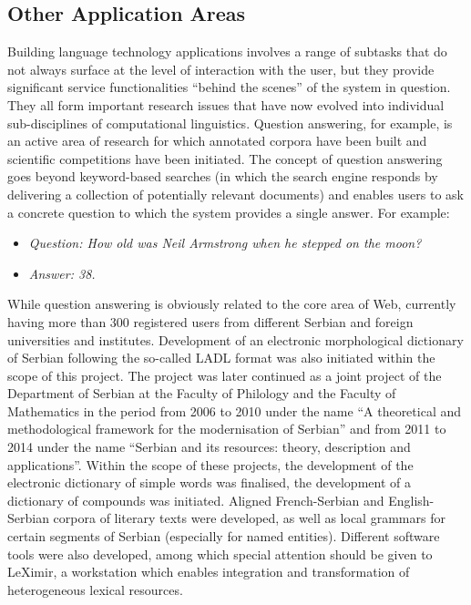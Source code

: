 \begin{multicols}{2}
 \subsection {Other Application Areas}

Building language technology applications involves a range of subtasks that do not always surface at the level of interaction with the user, but they provide significant service functionalities “behind the scenes” of the system in question. They all form important research issues that have now evolved into individual sub-disciplines of computational linguistics. Question answering, for example, is an active area of research for which annotated corpora have been built and scientific competitions have been initiated. The concept of question answering goes beyond keyword-based searches (in which the search engine responds by delivering a collection of potentially relevant documents) and enables users to ask a concrete question to which the system provides a single answer. For example:

\begin{itemize}
\item[] \textit{Question: How old was Neil Armstrong when he stepped on the moon?}
\item[] \textit{Answer: 38.}
\end{itemize}

While question answering is obviously related to the core area of Web, currently having more than 300 registered users from different Serbian and foreign universities and institutes. Development of an electronic morphological dictionary of Serbian following the so-called LADL format was also initiated within the scope of this project. \cite{KRSTEV} The project was later continued as a joint project of the Department of Serbian at the Faculty of Philology and the Faculty of Mathematics in the period from 2006 to 2010 under the name “A theoretical and methodological framework for the modernisation of Serbian” and from 2011 to 2014 under the name “Serbian and its resources: theory, description and applications”. Within the scope of these projects, the development of the electronic dictionary of simple words was finalised, the development of a dictionary of compounds was initiated. Aligned French-Serbian and English-Serbian corpora of literary texts were developed, as well as local grammars for certain segments of Serbian (especially for named entities). Different software tools were also developed, among which special attention should be given to LeXimir, a workstation which enables integration and transformation of heterogeneous lexical resources.
 

\end{multicols}
